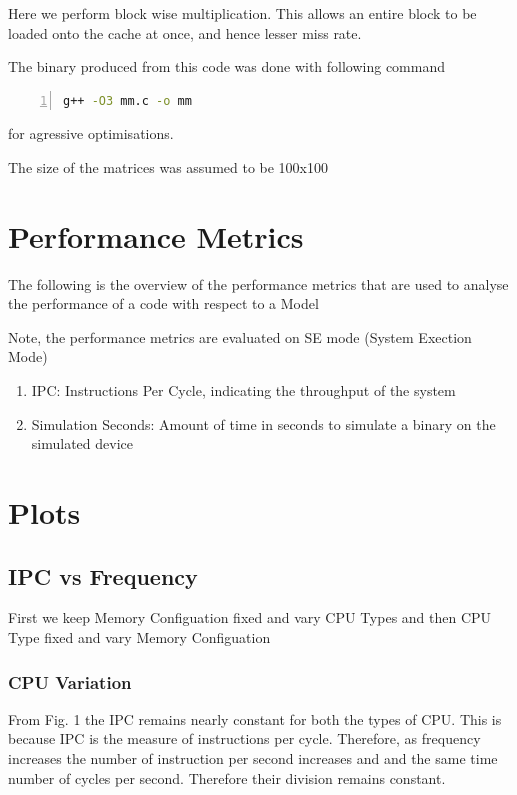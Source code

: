 \documentclass[12pt]{article}
\begin{document}
Here we perform block wise multiplication. This allows an entire block to be loaded onto the cache at once, and hence lesser miss rate.

The binary produced from this code was done with following command

\begin{lstlisting}[language=sh, frame=single, numbers=left, caption={Shell Script used to obtain binary}]
    g++ -O3 mm.c -o mm
\end{lstlisting}

for agressive optimisations.

The size of the matrices was assumed to be 100x100



\section{Performance Metrics}
\noindent The following is the overview of the performance metrics that are used to analyse the performance of a code with respect to a Model

Note, the performance metrics are evaluated on SE mode (System Exection Mode)
\begin{enumerate}
    \item IPC: Instructions Per Cycle, indicating the throughput of the system
    \item Simulation Seconds: Amount of time in seconds to simulate a binary on the simulated device
    
\end{enumerate}

\section{Plots}

\subsection{IPC vs Frequency}
First we keep Memory Configuation fixed and vary CPU Types and then CPU Type fixed and vary Memory Configuation
\subsubsection{CPU Variation}
From Fig. 1 the IPC remains nearly constant for both the types of CPU. This is because
IPC is the measure of instructions per cycle. Therefore, as frequency increases
the number of instruction per second increases and and the same time number of cycles per
second. Therefore their division remains constant.
\end{document}
